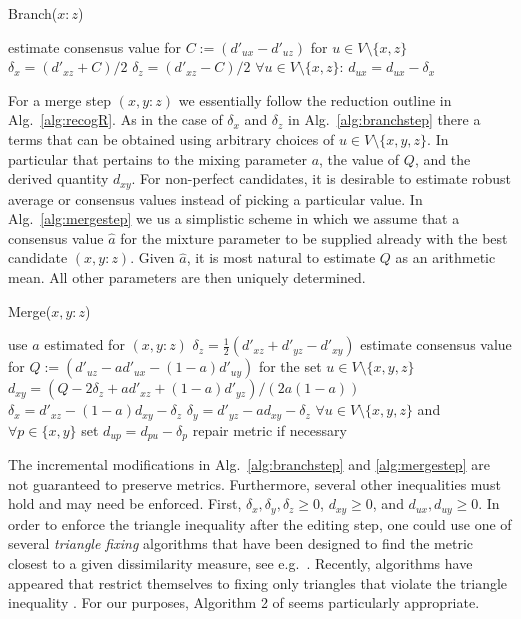 \documentclass[amsmath]{lni}
\begin{document}
\begin{algorithm}[H]
\caption{Branch($x:z$)} 
\label{alg:branchstep}
\SetAlgoLined
estimate consensus value for $C:=(d'_{ux}-d'_{uz})$ for $u\in
V\setminus\{x,z\}$ \;
$\delta_x = (d'_{xz}+C)/2$\;
$\delta_z = (d'_{xz}-C)/2$\;
$\forall u\in V\setminus\{x,z\}$: $d_{ux} =  d_{ux}-\delta_x$\;
\end{algorithm} 

For a merge step $(x,y:z)$ we essentially follow the reduction outline in
Alg.~\ref{alg:recogR}. As in the case of $\delta_x$ and $\delta_z$ in
Alg.~\ref{alg:branchstep} there a terms that can be obtained using
arbitrary choices of $u\in V\setminus\{x,y,z\}$. In particular that
pertains to the mixing parameter $a$, the value of $Q$, and the derived
quantity $d_{xy}$. For non-perfect candidates, it is desirable to estimate
robust average or consensus values instead of picking a particular value.
In Alg.~\ref{alg:mergestep} we us a simplistic scheme in which we assume
that a consensus value $\hat a$ for the mixture parameter to be supplied
already with the best candidate $(x,y:z)$. Given $\hat a$, it is most
natural to estimate $Q$ as an arithmetic mean. All other parameters are
then uniquely determined.

\begin{algorithm}[H]
\caption{Merge($x,y:z$)} 
\label{alg:mergestep} 
\SetAlgoLined
use $a$ estimated for $(x,y:z)$\;
$\delta_z = \frac{1}{2}(d'_{xz}+d'_{yz}-d'_{xy})$\;
estimate consensus value for $Q:=(d'_{uz}-a d'_{ux}-(1-a) d'_{uy})$ for the 
set $u\in V\setminus\{x,y,z\}$\;
$d_{xy} = (Q-2 \delta_z + a d'_{xz}+(1-a) d'_{yz})/(2a(1-a))$\;
$\delta_x = d'_{xz} - (1-a) d_{xy} - \delta_z$\;
$\delta_y = d'_{yz} -   a   d_{xy} - \delta_z$\;
$\forall u\in V\setminus\{x,y,z\}$ and $\forall p\in\{x,y\}$ set   
$d_{up} = d_{pu} -\delta_p$\;
repair metric if necessary\;
\end{algorithm} 

The incremental modifications in Alg.~\ref{alg:branchstep} and
\ref{alg:mergestep} are not guaranteed to preserve metrics. Furthermore,
several other inequalities must hold and may need be enforced. First,
$\delta_x,\delta_y,\delta_z\ge 0$, $d_{xy}\ge 0$, and $d_{ux},d_{uy}\ge
0$. In order to enforce the triangle inequality after the editing step, one
could use one of several \emph{triangle fixing} algorithms that have been
designed to find the metric closest to a given dissimilarity measure, see
e.g.\ \cite{Sra:05,Brickel:08}. Recently, algorithms have appeared that
restrict themselves to fixing only triangles that violate the triangle
inequality \cite{Gilbert:17}. For our purposes, Algorithm 2 of
\cite{Gilbert:17} seems particularly appropriate.
\end{document}
